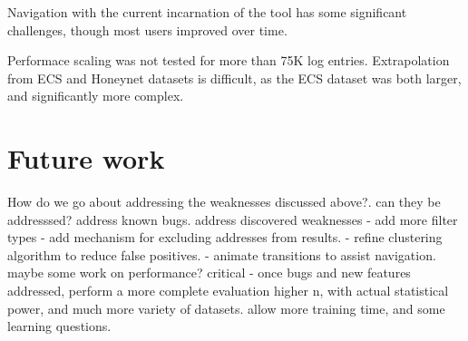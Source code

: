 Navigation with the current incarnation of the tool has some significant challenges, though most users improved over time. 

Performace scaling was not tested for more than 75K log entries. Extrapolation from ECS and Honeynet datasets is difficult, as the ECS dataset was both larger, and significantly more complex. 

\section{Future work}
How do we go about addressing the weaknesses discussed above?.
can they be addresssed?
address known bugs.
address discovered weaknesses
 - add more filter types
 - add mechanism for excluding addresses from results.
 - refine clustering algorithm to reduce false positives. 
 - animate transitions to assist navigation.
maybe some work on performance?
critical - once bugs and new features addressed, perform a more complete evaluation
higher n, with actual statistical power, and much more variety of datasets. allow more training time, and some learning questions.